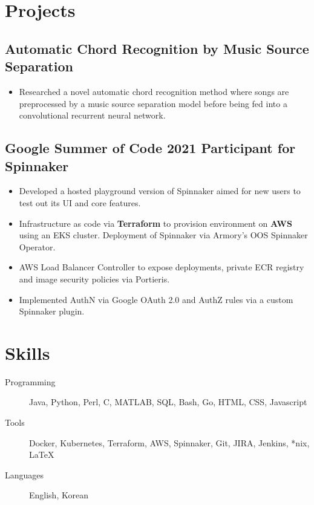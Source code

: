 \documentclass{mycv}
\begin{document}
\section{Projects}

%
\subsection{Automatic Chord Recognition by Music Source Separation
 \href{https://ko28.github.io/chord-transcription/}{
}
}
\begin{itemize}
  \item {
    Researched a novel automatic chord recognition method where songs are preprocessed by a music source separation model before being fed into a convolutional recurrent neural network. 
  }
\iffalse
\item{
Experiments have showed that the model trained with song computed from music source separation performed similar on average compared to a model trained on the original dataset.
}
\fi 
 \end{itemize}


\subsection{Google Summer of Code 2021 Participant for Spinnaker\
    \href{https://github.com/spinnaker/try.spinnaker.io}{}
}
\begin{itemize}
  \item {
    Developed a hosted playground version of Spinnaker aimed for new users to test out its UI and core features.
  }
 \item{
 Infrastructure as code via \textbf{Terraform} to provision environment on \textbf{AWS} using an EKS cluster. Deployment of Spinnaker via Armory's OOS Spinnaker Operator.
 }
 \item{
 AWS Load Balancer Controller to expose deployments, private ECR registry and image security policies via Portieris. 
}
\item{
    Implemented AuthN via Google OAuth 2.0 and AuthZ rules via a custom Spinnaker plugin.
}
 \end{itemize}
\section{Skills}
\begin{description}
  \item[Programming] Java, Python, Perl, C, MATLAB, SQL, Bash, Go, HTML, CSS, Javascript
  \item[Tools] Docker, Kubernetes, Terraform, AWS, Spinnaker, Git, JIRA, Jenkins, *nix, \LaTeX 
  \item[Languages] English, Korean
\end{description}
\iffalse
\end{document}
